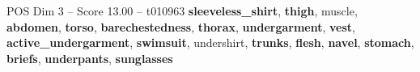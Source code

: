 \begin{textsample}{POS Dim 3 – Score 13.00 – t010963}  \label{ex:f3_pos_039}
\textbf{sleeveless\_shirt}, \textbf{thigh}, muscle, \textbf{abdomen}, \textbf{torso}, \textbf{barechestedness}, \textbf{thorax}, \textbf{undergarment}, \textbf{vest}, \textbf{active\_undergarment}, \textbf{swimsuit}, undershirt, \textbf{trunks}, \textbf{flesh}, \textbf{navel}, \textbf{stomach}, \textbf{briefs}, \textbf{underpants}, \textbf{sunglasses}

\end{textsample}
